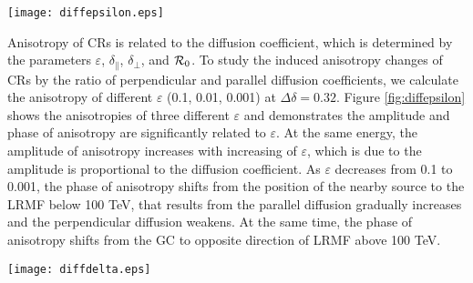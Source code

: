 \documentclass[a4paper,11pt]{article}
\begin{document}
\begin{figure*}

	\texttt{[image: diffepsilon.eps]}
	\caption{ Energy dependences of the amplitude (left) and phase (right)	of the  anisotropies for $\Delta\delta (\delta_\perp-\delta_\parallel)=0.32$ together with the contribution from nearby Geminga SNR source and local regular magnetic field.  The three black lines correspond to the results for three different $\varepsilon ( = 0.1,~ 0.01,~ 0.001)$.
	}
	\label{fig:diffepsilon}
\end{figure*}

Anisotropy of CRs is related to the diffusion coefficient, which is determined by the parameters $\varepsilon$, $\delta_\parallel$, $\delta_\perp$, and ${\cal R}_{0}$.
To study the induced anisotropy changes of CRs by the ratio of  perpendicular and parallel diffusion coefficients, we 
calculate the anisotropy of different $\varepsilon$ (0.1,  0.01,  0.001) at   $\Delta\delta = 0.32$.
Figure \ref{fig:diffepsilon} shows the anisotropies of three different  $\varepsilon$ and demonstrates the amplitude and phase of anisotropy are significantly related to $\varepsilon$.
At the same energy, the amplitude of anisotropy increases with increasing of  $\varepsilon$, which is due to the amplitude is proportional to the diffusion coefficient.  
As  $\varepsilon$ decreases from 0.1 to 0.001, the phase of anisotropy shifts from the position of the nearby source to the LRMF below 100 TeV, that results from the parallel diffusion gradually  increases and the perpendicular  diffusion weakens.
At the same time, the phase of anisotropy shifts from the GC to opposite direction of  LRMF above  100 TeV. 

\begin{figure*}
	\texttt{[image: diffdelta.eps]}
	\caption{
		Energy dependences of the amplitude (left) and phase (right)	of the  anisotropies for $\varepsilon =0.01$ together with the contribution from nearby Geminga SNR source and LRMF.  The three black lines correspond to the results for three different $\Delta\delta (\delta_\perp-\delta_\parallel)( = 0, ~ 0.3, ~ 0.8)$.
	}
	\label{fig:diffdelta}
\end{figure*}	
\end{document}
